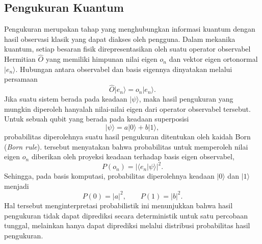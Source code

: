 \subsection{Pengukuran Kuantum}
Pengukuran merupakan tahap yang menghubungkan informasi kuantum dengan hasil observasi klasik yang dapat diakses oleh pengguna. Dalam mekanika kuantum, setiap besaran fisik direpresentasikan oleh suatu operator observabel Hermitian $\hat{O}$ yang memiliki himpunan nilai eigen $o_n$ dan vektor eigen ortonormal $|e_n\rangle$. Hubungan antara observabel dan basis eigennya dinyatakan melalui persamaan
\begin{equation}
\hat{O}|e_n\rangle = o_n |e_n\rangle.
\end{equation}
Jika suatu sistem berada pada keadaan $|\psi\rangle$, maka hasil pengukuran yang mungkin diperoleh hanyalah nilai-nilai eigen dari operator observabel tersebut. Untuk sebuah qubit yang berada pada keadaan superposisi
\begin{equation}
|\psi\rangle = a|0\rangle + b|1\rangle,
\end{equation}
probabilitas diperolehnya suatu hasil pengukuran ditentukan oleh kaidah Born (\textit{Born rule}). tersebut menyatakan bahwa probabilitas untuk memperoleh nilai eigen $o_n$ diberikan oleh proyeksi keadaan terhadap basis eigen observabel,
\begin{equation}
P(o_n) = |\langle e_n|\psi\rangle|^2.
\end{equation}
Sehingga, pada basis komputasi, probabilitas diperolehnya keadaan $|0\rangle$ dan $|1\rangle$ menjadi
\begin{equation} P(0)=|a|^2, \qquad P(1)=|b|^2.
\end{equation}
Hal tersebut menginterpretasi probabilistik ini menunjukkan bahwa hasil pengukuran tidak dapat diprediksi secara deterministik untuk satu percobaan tunggal, melainkan hanya dapat diprediksi melalui distribusi probabilitas hasil pengukuran.

